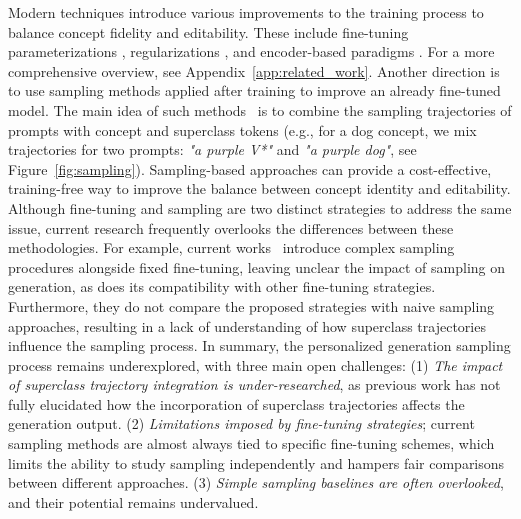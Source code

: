 Modern techniques introduce various improvements to the training process to balance concept fidelity and editability. These include fine-tuning parameterizations \citep{DB, TI, CD, svdiff, r1e, ortogonal}, regularizations \citep{DB, CD}, and encoder-based paradigms \citep{elite}. For a more comprehensive overview, see Appendix~\ref{app:related_work}. Another direction is to use sampling methods applied after training to improve an already fine-tuned model. The main idea of such methods~\citep{profusion, photoswap} is to combine the sampling trajectories of prompts with concept and superclass tokens (e.g., for a dog concept, we mix trajectories for two prompts: \textit{"a purple V*"} and \textit{"a purple dog"}, see Figure~\ref{fig:sampling}). Sampling-based approaches can provide a cost-effective, training-free way to improve the balance between concept identity and editability. Although fine-tuning and sampling are two distinct strategies to address the same issue, current research frequently overlooks the differences between these methodologies. For example, current works~\citep{profusion, photoswap} introduce complex sampling procedures alongside fixed fine-tuning, leaving unclear the impact of sampling on generation, as does its compatibility with other fine-tuning strategies. Furthermore, they do not compare the proposed strategies with naive sampling approaches, resulting in a lack of understanding of how superclass trajectories influence the sampling process.
In summary, the personalized generation sampling process remains underexplored, with three main open challenges: (1) \textit{The impact of superclass trajectory integration is under-researched}, as previous work has not fully elucidated how the incorporation of superclass trajectories affects the generation output. (2) \textit{Limitations imposed by fine-tuning strategies}; current sampling methods are almost always tied to specific fine-tuning schemes, which limits the ability to study sampling independently and hampers fair comparisons between different approaches. (3) \textit{Simple sampling baselines are often overlooked}, and their potential remains undervalued.


